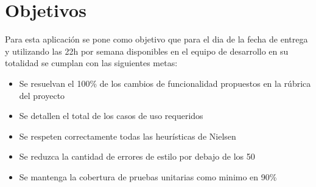 \section{Objetivos}



Para esta aplicación se pone como objetivo que para el dia de la fecha de entrega y utilizando las 22h por semana disponibles en el equipo de desarrollo en su totalidad se cumplan con las siguientes metas:
\begin{itemize}
    \item Se resuelvan el 100\% de los cambios de funcionalidad propuestos en la rúbrica del proyecto
    \item Se detallen el total de los casos de uso requeridos
    \item Se respeten correctamente todas las heurísticas de Nielsen
    \item Se reduzca la cantidad de errores de estilo por debajo de los 50
    \item Se mantenga la cobertura de pruebas unitarias como minimo en 90\%
\end{itemize}
  
